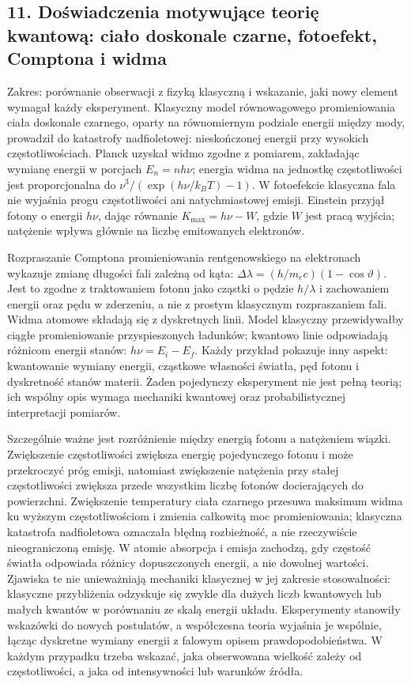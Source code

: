\documentclass[11pt,a4paper]{article}
\begin{document}
\subsection{11. Doświadczenia motywujące teorię kwantową: ciało doskonale czarne, fotoefekt, Comptona i widma}
Zakres: porównanie obserwacji z fizyką klasyczną i wskazanie, jaki nowy element wymagał każdy eksperyment. Klasyczny model równowagowego promieniowania ciała doskonale czarnego, oparty na równomiernym podziale energii między mody, prowadził do katastrofy nadfioletowej: nieskończonej energii przy wysokich częstotliwościach. Planck uzyskał widmo zgodne z pomiarem, zakładając wymianę energii w porcjach \(E_n=nh\nu\); energia widma na jednostkę częstotliwości jest proporcjonalna do \(\nu^3/(\exp(h\nu/k_BT)-1)\). W fotoefekcie klasyczna fala nie wyjaśnia progu częstotliwości ani natychmiastowej emisji. Einstein przyjął fotony o energii \(h\nu\), dając równanie \(K_{\max}=h\nu-W\), gdzie \(W\) jest pracą wyjścia; natężenie wpływa głównie na liczbę emitowanych elektronów.

Rozpraszanie Comptona promieniowania rentgenowskiego na elektronach wykazuje zmianę długości fali zależną od kąta: \(\Delta\lambda=(h/m_ec)(1-\cos\vartheta)\). Jest to zgodne z traktowaniem fotonu jako cząstki o pędzie \(h/\lambda\) i zachowaniem energii oraz pędu w zderzeniu, a nie z prostym klasycznym rozpraszaniem fali. Widma atomowe składają się z dyskretnych linii. Model klasyczny przewidywałby ciągłe promieniowanie przyspieszonych ładunków; kwantowo linie odpowiadają różnicom energii stanów: \(h\nu=E_i-E_f\). Każdy przykład pokazuje inny aspekt: kwantowanie wymiany energii, cząstkowe własności światła, pęd fotonu i dyskretność stanów materii. Żaden pojedynczy eksperyment nie jest pełną teorią; ich wspólny opis wymaga mechaniki kwantowej oraz probabilistycznej interpretacji pomiarów.

Szczególnie ważne jest rozróżnienie między energią fotonu a natężeniem wiązki. Zwiększenie częstotliwości zwiększa energię pojedynczego fotonu i może przekroczyć próg emisji, natomiast zwiększenie natężenia przy stałej częstotliwości zwiększa przede wszystkim liczbę fotonów docierających do powierzchni. Zwiększenie temperatury ciała czarnego przesuwa maksimum widma ku wyższym częstotliwościom i zmienia całkowitą moc promieniowania; klasyczna katastrofa nadfioletowa oznaczała błędną rozbieżność, a nie rzeczywiście nieograniczoną emisję. W atomie absorpcja i emisja zachodzą, gdy częstość światła odpowiada różnicy dopuszczonych energii, a nie dowolnej wartości. Zjawiska te nie unieważniają mechaniki klasycznej w jej zakresie stosowalności: klasyczne przybliżenia odzyskuje się zwykle dla dużych liczb kwantowych lub małych kwantów w porównaniu ze skalą energii układu. Eksperymenty stanowiły wskazówki do nowych postulatów, a współczesna teoria wyjaśnia je wspólnie, łącząc dyskretne wymiany energii z falowym opisem prawdopodobieństwa. W każdym przypadku trzeba wskazać, jaka obserwowana wielkość zależy od częstotliwości, a jaka od intensywności lub warunków źródła.
\end{document}
